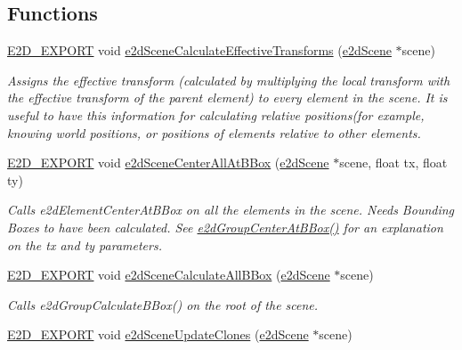 \subsection*{Functions}
\begin{DoxyCompactItemize}
\item 
\hyperlink{Ez2DS_8h_a9f14e9cb869e1a85fdaba03afcca0df9}{E2\-D\-\_\-\-E\-X\-P\-O\-R\-T} void \hyperlink{group__e2dScene_ga6981f2448904c96723449cb84ffb4d8a}{e2d\-Scene\-Calculate\-Effective\-Transforms} (\hyperlink{structe2dScene}{e2d\-Scene} $\ast$scene)
\begin{DoxyCompactList}\small\item\em Assigns the effective transform (calculated by multiplying the local transform with the effective transform of the parent element) to every element in the scene. It is useful to have this information for calculating relative positions(for example, knowing world positions, or positions of elements relative to other elements. \end{DoxyCompactList}\item 
\hyperlink{Ez2DS_8h_a9f14e9cb869e1a85fdaba03afcca0df9}{E2\-D\-\_\-\-E\-X\-P\-O\-R\-T} void \hyperlink{group__e2dScene_ga1d33ba7ce041a68b061cfa6b0291b886}{e2d\-Scene\-Center\-All\-At\-B\-Box} (\hyperlink{structe2dScene}{e2d\-Scene} $\ast$scene, float tx, float ty)
\begin{DoxyCompactList}\small\item\em Calls e2d\-Element\-Center\-At\-B\-Box on all the elements in the scene. Needs Bounding Boxes to have been calculated. See \hyperlink{group__e2dGroup_ga2800a7dc3827e8753e2f2c6ef2e05eb9}{e2d\-Group\-Center\-At\-B\-Box()} for an explanation on the tx and ty parameters. \end{DoxyCompactList}\item 
\hyperlink{Ez2DS_8h_a9f14e9cb869e1a85fdaba03afcca0df9}{E2\-D\-\_\-\-E\-X\-P\-O\-R\-T} void \hyperlink{group__e2dScene_gaa202610ee0b2e5c47bded576b365c195}{e2d\-Scene\-Calculate\-All\-B\-Box} (\hyperlink{structe2dScene}{e2d\-Scene} $\ast$scene)
\begin{DoxyCompactList}\small\item\em Calls e2d\-Group\-Calculate\-B\-Box() on the root of the scene. \end{DoxyCompactList}\item 
\hyperlink{Ez2DS_8h_a9f14e9cb869e1a85fdaba03afcca0df9}{E2\-D\-\_\-\-E\-X\-P\-O\-R\-T} void \hyperlink{group__e2dScene_gadfc497f7e653990ad03c4cd845eb8943}{e2d\-Scene\-Update\-Clones} (\hyperlink{structe2dScene}{e2d\-Scene} $\ast$scene)

\end{DoxyCompactItemize}
